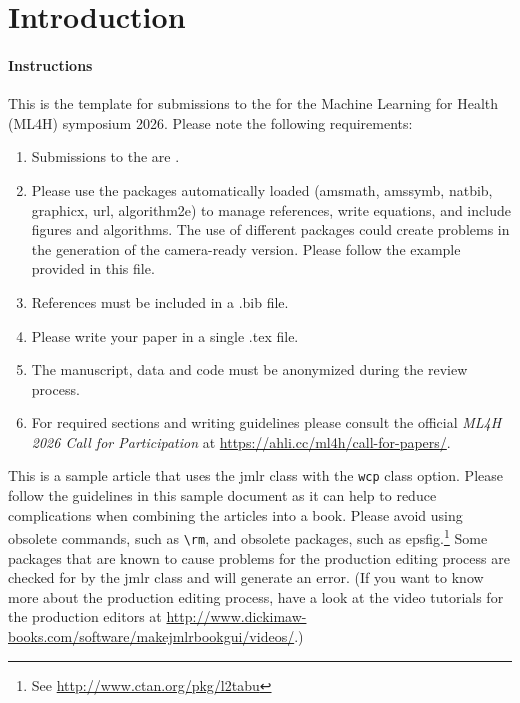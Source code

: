 \documentclass[pmlr,twocolumn,10pt]{jmlr} %
\begin{document}
\section{Introduction}
\label{sec:intro}

\paragraph{Instructions} This is the template for submissions to the \textbf{\mlhtrackname} for the Machine Learning for Health (ML4H) symposium 2026. Please note the following requirements:

\begin{enumerate}
    \item Submissions to the \mlhtrackname{} are \mlhpagelimit.
    \item Please use the packages automatically loaded (amsmath, amssymb, natbib, graphicx, url, algorithm2e) to manage references, write equations, and include figures and algorithms. The use of different packages could create problems in the generation of the camera-ready version. Please follow the example provided in this file.
    \item References must be included in a .bib file.
    \item Please write your paper in a single .tex file.
    \ifmlhanonymous
    \item The manuscript, data and code must be anonymized during the review process.
    \fi
    \item For required sections and writing guidelines please consult the official \emph{ML4H 2026 Call for Participation} at \url{https://ahli.cc/ml4h/call-for-papers/}.
\end{enumerate}

\newpage


This is a sample article that uses the \textsf{jmlr} class with
the \texttt{wcp} class option.  Please follow the guidelines in
this sample document as it can help to reduce complications when
combining the articles into a book. Please avoid using obsolete
commands, such as \verb|\rm|, and obsolete packages, such as
\textsf{epsfig}.\footnote{See
\url{http://www.ctan.org/pkg/l2tabu}} Some packages that are known
to cause problems for the production editing process are checked for
by the \textsf{jmlr} class and will generate an error. (If you want
to know more about the production editing process, have a look at
the video tutorials for the production editors at
\url{http://www.dickimaw-books.com/software/makejmlrbookgui/videos/}.)
\end{document}
